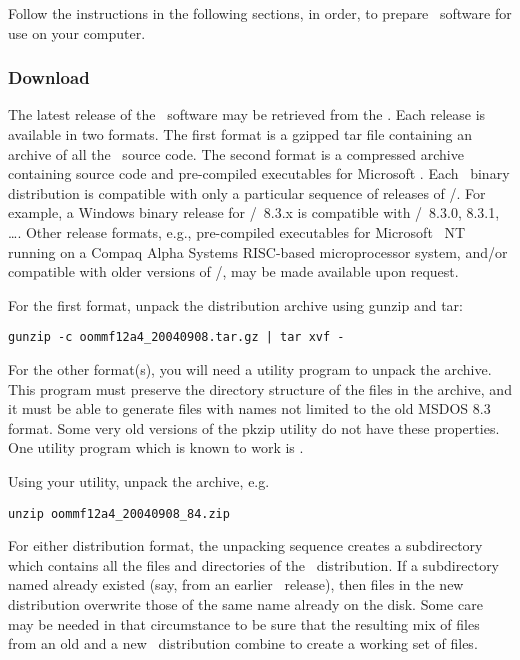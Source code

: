 Follow the instructions in the following sections, in order,
to prepare \OOMMF\ software for use on your computer.

\subsubsection{Download}

The latest release of the \OOMMF\ software may be retrieved from the
.  Each release is
available in two formats.  The first format is a gzipped tar file
containing an archive of all the \OOMMF\ source code.  The second format
is a  compressed archive containing source code and
pre-compiled executables for Microsoft \Windows.  Each \Windows\ binary
distribution is compatible with only a particular sequence of releases
of \Tcl/\Tk.  For example, a Windows binary release for \Tcl/\Tk\ 8.3.x
is compatible with \Tcl/\Tk\ 8.3.0, 8.3.1, \ldots.  Other release
formats, e.g., pre-compiled executables for Microsoft
\Windows~NT running on a Compaq Alpha Systems RISC-based microprocessor
system, and/or compatible with older versions of \Tcl/\Tk, may be made
available upon request.

For the first format, unpack the distribution archive using gunzip and
tar:
\begin{verbatim}
gunzip -c oommf12a4_20040908.tar.gz | tar xvf -
\end{verbatim}

For the other format(s), you will need a utility program to unpack the
 archive.  This program must preserve the directory structure
of the files in the archive, and it must be able to generate files with
names not limited to the old MSDOS 8.3 format.  Some very old
versions of the pkzip utility do not have these properties.  One utility
program which is known to work is
.

Using your utility, unpack the  archive, e.g.
\begin{verbatim}
unzip oommf12a4_20040908_84.zip
\end{verbatim}

For either distribution format, the unpacking sequence creates a
subdirectory  which contains all the files and directories
of the \OOMMF\ distribution.  If a subdirectory named 
already existed (say, from an earlier \OOMMF\ release), then
files in the new distribution overwrite those of the same name already
on the disk.  Some care may be needed in that circumstance to be
sure that the resulting mix of files from an old and a new 
\OOMMF\ distribution combine to create a working set of files.

